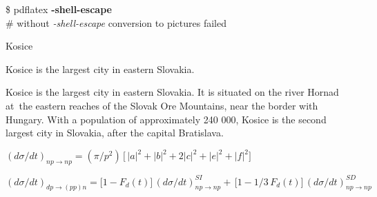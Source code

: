 \documentclass[preview,border=1,multi,convert={density=300,%
  outext=.png}]{standalone}
\begin{document}
\begin{preview}
  {\ttfamily
    [shell]\$ pdflatex {\bfseries -shell-escape} \currfilename \\
    \# without {\em -shell-escape} conversion to pictures failed
  }
\end{preview}
\begin{preview}
  Kosice
\end{preview}
\begin{preview}
  Kosice is the largest city in eastern Slovakia.
\end{preview}
\begin{preview}
  Kosice is the largest city in eastern Slovakia. It is situated on the river
  Hornad at~the eastern reaches of the Slovak Ore Mountains, near the border
  with Hungary. With a population of approximately 240 000, Kosice is the second
  largest city in Slovakia, after the capital Bratislava.
\end{preview}
\begin{preview}
  $(d\sigma/dt)_{np \to np} = (\pi/p^2)\,
  \bigl[\,|a|^2 + |b|^2 + 2|c|^2 + |e|^2 + |f|^2 \bigr]$
\end{preview}
\begin{preview}
  $(d\sigma/dt)_{dp \to (pp)n} = \bigl[1 - F_d(t)\bigr]\,(d\sigma/dt)^{SI}_{np
    \to np} +\,\bigl[1 - 1/3\,F_d(t)\bigr]\,(d\sigma/dt)^{SD}_{np \to np}$
\end{preview}
\end{document}
